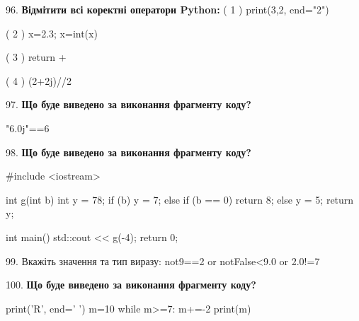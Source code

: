 \documentclass[11pt]{article}
\begin{document}
96. %
\textbf{Відмітити всі коректні оператори Python:}
( 1 ) print(3,2, end="2")

( 2 ) x=2.3; x=int(x)

( 3 ) return +

( 4 ) (2+2j)//2
\par\vspace{5mm}

97. \textbf{Що буде виведено за виконання фрагменту коду?}

"6.0j"==6
\par\vspace{5mm}

98. \textbf{Що буде виведено за виконання фрагменту коду?}

#include <iostream>

int g(int b){
    int y = 78;
    if (b) 
        y = 7;
    else if (b == 0)
         return 8;
    else
         y = 5;
    return y;
}

int main(){
    std::cout << g(-4);
    return 0;
}

\par\vspace{5mm}

99. 
Вкажіть значення та тип виразу:
not9==2 or notFalse<9.0 or 2.0!=7
\par\vspace{5mm}

100. \textbf{Що буде виведено за виконання фрагменту коду?}

print('R', end=' ')
m=10
while m>=7:
    m+=-2
print(m)

\par\vspace{5mm}

\newpage
\end{document}
